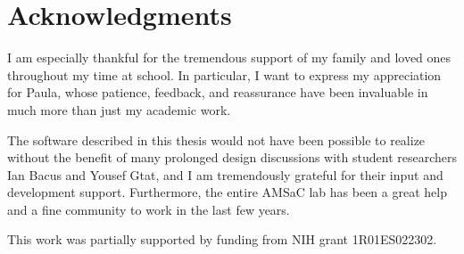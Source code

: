 \documentclass[../thesis]{subfiles}
\begin{document}
\chapter*{Acknowledgments}
\DoubleSpacing
I am especially thankful for the tremendous support of my family and
loved ones throughout my time at school. In particular, I want to
express my appreciation for Paula, whose patience, feedback, and
reassurance have been invaluable in much more than just my academic work.

The software described in this thesis would not have been possible to
realize without the benefit of many prolonged design discussions with
student researchers Ian Bacus and Yousef Gtat, and I am tremendously
grateful for their input and development support. Furthermore, the
entire AMSaC lab has been a great help and a fine community to work in
the last few years.

This work was partially supported by funding from NIH grant
1R01ES022302.

\clearpage
\SingleSpacing

\end{document}
